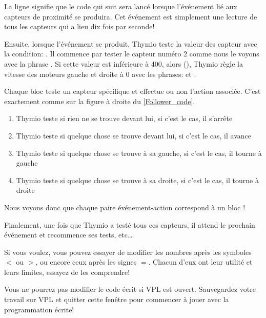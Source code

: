 La ligne  signifie que le code qui suit sera lancé lorsque l'événement lié aux capteurs de proximité se produira. Cet événement est simplement une lecture de tous les capteurs qui a lieu dix fois par seconde!

Ensuite, lorsque l'événement se produit, Thymio teste la valeur des capteur avec la condition: . Il commence par tester le capteur numéro 2 comme nous le voyons avec la phrase . Si cette valeur est inférieure à 400, alors (), Thymio règle la vitesse des moteurs gauche et droite à 0 avec les phrases:  et .

Chaque bloc  teste un capteur spécifique et effectue ou non l'action associée. C'est exactement comme sur la figure à droite du \cref{Follower_code}.

\begin{enumerate}
	\item Thymio teste si rien ne se trouve devant lui, si c'est le cas, il s'arrête
	\item Thymio teste si quelque chose se trouve devant lui, si c'est le cas, il avance
	\item Thymio teste si quelque chose se trouve à sa gauche, si c'est le cas, il tourne à gauche
	\item Thymio teste si quelque chose se trouve à sa droite, si c'est le cas, il tourne à droite
\end{enumerate}

Nous voyons donc que chaque paire événement-action correspond à un bloc !

Finalement, une fois que Thymio a testé tous ces capteurs, il attend le prochain événement  et recommence ses tests, etc\ldots

Si vous voulez, vous pouvez essayer de modifier les nombres après les symboles $<$ ou $>$, ou encore ceux après les signes $=$. Chacun d'eux ont leur utilité et leurs limites, essayez de les comprendre!

Vous ne pourrez pas modifier le code écrit si VPL est ouvert. Sauvegardez votre travail sur VPL et quitter cette fenêtre pour commencer à jouer avec la programmation écrite!